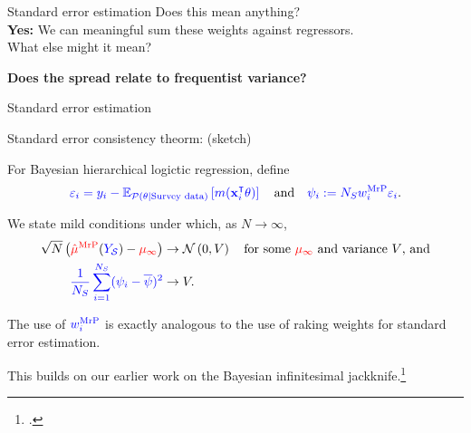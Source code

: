 




\begin{frame}[c]{Standard error estimation}
\centering
{
Does this mean anything?  \\
\textbf{Yes: }We can meaningful sum these weights against regressors.\\[1em]
What else might it mean?\\
}

{
\textbf{Does the spread relate to frequentist variance?}
}

\splitpagenoline{
    \AlexanderWeightPlot{}
}{
    \LaxWeightPlot{}
}
\end{frame}




\begin{frame}[c]{Standard error estimation}



\begin{block}{Standard error consistency theorm: (sketch)}

For Bayesian hierarchical logictic regression, define
$$
\textcolor{blue}{\varepsilon_i = y_i - \mathbb{E}_{\textcolor{blue}{\mathcal{P}(\theta \vert \textrm{Survey data})}}\left[ m(\mathbf{x}_i^\intercal \theta)\right]\,}
\quad\textrm{and}\quad
\textcolor{blue}{\psi_i := {N_S} w_i^{\mathrm{MrP}} \varepsilon_i}.
$$

We state mild conditions under which, as $N \rightarrow \infty$,
$$
\begin{aligned}
    \sqrt{N}\left(\textcolor{red}{\hat{\mu}^{\mathrm{MrP}}}(\textcolor{blue}{\textcolor{blue}{Y_{\mathcal{S}}}}) - \textcolor{red}{\mu_\infty} \right) \rightarrow{}&
    \mathcal{N}\left(0, V\right) \quad\textrm{for some $\textcolor{red}{\mu_\infty}$ and variance $V$, and}\\
\textcolor{blue}{\frac{1}{{N_S}} \sum_{i=1}^{N_S} (\psi_i - \overline{\psi})^2} \rightarrow{}& V.
\end{aligned}
$$
\end{block}

The use of $\textcolor{blue}{w_i^{\mathrm{MrP}}}$ is exactly analogous to the use of raking weights
for standard error estimation.

This builds on our earlier work on the Bayesian
infinitesimal jackknife.\footcite{giordano:2024:bayesij}

\end{frame}


